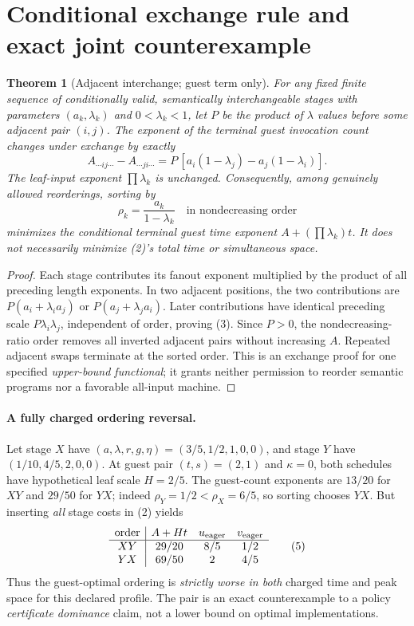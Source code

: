 \documentclass[11pt]{article}
\newtheorem{theorem}{Theorem}
\begin{document}
\section{Conditional exchange rule and exact joint counterexample}
\begin{theorem}[Adjacent interchange; guest term only]\label{th:exchange}
For any fixed finite sequence of conditionally valid, \emph{semantically
interchangeable} stages with parameters $(a_k,\lambda_k)$ and
$0<\lambda_k<1$, let $P$ be the product of $\lambda$ values before
some adjacent pair $(i,j)$. The exponent of the terminal guest
invocation count changes under exchange by exactly
\[
  A_{\cdots ij\cdots}-A_{\cdots ji\cdots}
     =P\,[a_i(1-\lambda_j)-a_j(1-\lambda_i)].\tag{3}
\]
The leaf-input exponent $\prod\lambda_k$ is unchanged. Consequently,
\emph{among genuinely allowed reorderings}, sorting by
\[
                 \rho_k=\frac{a_k}{1-\lambda_k}
\quad\text{in nondecreasing order}\tag{4}
\]
minimizes the \emph{conditional terminal guest time exponent}
$A+ (\prod\lambda_k)t$. It does \emph{not} necessarily minimize
(2)'s total time or simultaneous space.
\end{theorem}
\begin{proof}
Each stage contributes its fanout exponent multiplied by the product
of all preceding length exponents. In two adjacent positions, the two
contributions are $P(a_i+\lambda_i a_j)$ or
$P(a_j+\lambda_j a_i)$. Later contributions have identical preceding
scale $P\lambda_i\lambda_j$, independent of order, proving (3).
Since $P>0$, the nondecreasing-ratio order removes all inverted
adjacent pairs without increasing $A$. Repeated adjacent swaps
terminate at the sorted order. This is an exchange proof for one
specified \emph{upper-bound functional}; it grants neither permission to
reorder semantic programs nor a favorable all-input machine.
\end{proof}

\paragraph{A fully charged ordering reversal.}
Let stage $X$ have
$(a,\lambda,r,g,\eta)=(3/5,1/2,1,0,0)$,
and stage $Y$ have
$(1/10,4/5,2,0,0)$. At guest pair $(t,s)=(2,1)$ and
$\kappa=0$, both schedules have hypothetical leaf scale $H=2/5$.
The guest-count exponents are $13/20$ for $XY$ and $29/50$ for $YX$;
indeed $\rho_Y=1/2<\rho_X=6/5$, so sorting chooses $YX$.
But inserting \emph{all} stage costs in (2) yields
\[
\begin{array}{c|ccc}
\text{order}&A+Ht&u_{\rm eager}&v_{\rm eager}\\\hline
XY&29/20&8/5&1/2\\
YX&69/50&2&4/5
\end{array}\tag{5}
\]
Thus the guest-optimal ordering is \emph{strictly worse in both}
charged time and peak space for this declared profile. The pair is
an exact counterexample to a policy \emph{certificate dominance}
claim, not a lower bound on optimal implementations.
\end{document}
